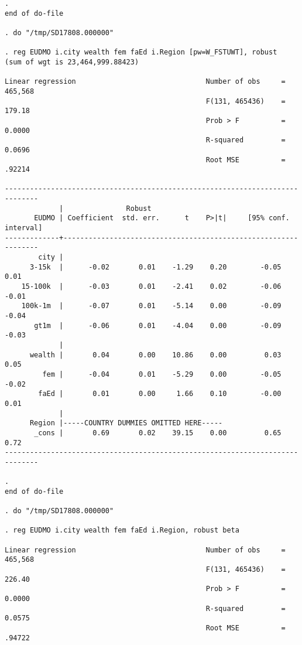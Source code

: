 \documentclass[11pt, letterpaper]{article}
\begin{document}
\begin{spacing}{1.9}
\begin{spacing}{.5}
\begin{scriptsize}
\begin{verbatim}
. 
end of do-file

. do "/tmp/SD17808.000000"

. reg EUDMO i.city wealth fem faEd i.Region [pw=W_FSTUWT], robust
(sum of wgt is 23,464,999.88423)

Linear regression                               Number of obs     =    465,568
                                                F(131, 465436)    =     179.18
                                                Prob > F          =     0.0000
                                                R-squared         =     0.0696
                                                Root MSE          =     .92214

------------------------------------------------------------------------------
             |               Robust
       EUDMO | Coefficient  std. err.      t    P>|t|     [95% conf. interval]
-------------+----------------------------------------------------------------
        city |
      3-15k  |      -0.02       0.01    -1.29    0.20        -0.05        0.01
    15-100k  |      -0.03       0.01    -2.41    0.02        -0.06       -0.01
    100k-1m  |      -0.07       0.01    -5.14    0.00        -0.09       -0.04
       gt1m  |      -0.06       0.01    -4.04    0.00        -0.09       -0.03
             |
      wealth |       0.04       0.00    10.86    0.00         0.03        0.05
         fem |      -0.04       0.01    -5.29    0.00        -0.05       -0.02
        faEd |       0.01       0.00     1.66    0.10        -0.00        0.01
             |
      Region |-----COUNTRY DUMMIES OMITTED HERE-----
       _cons |       0.69       0.02    39.15    0.00         0.65        0.72
------------------------------------------------------------------------------

. 
end of do-file

. do "/tmp/SD17808.000000"

. reg EUDMO i.city wealth fem faEd i.Region, robust beta 

Linear regression                               Number of obs     =    465,568
                                                F(131, 465436)    =     226.40
                                                Prob > F          =     0.0000
                                                R-squared         =     0.0575
                                                Root MSE          =     .94722


\end{verbatim}
\end{scriptsize}
\end{spacing}
\end{spacing}
\end{document}
